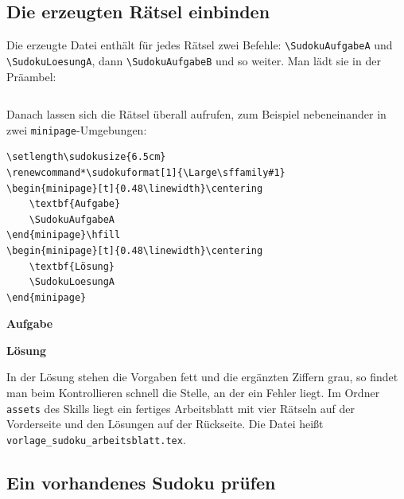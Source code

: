 \subsection{Die erzeugten Rätsel einbinden}

Die erzeugte Datei enthält für jedes Rätsel zwei Befehle: \texttt{\textbackslash SudokuAufgabeA} und \texttt{\textbackslash SudokuLoesungA}, dann \texttt{\textbackslash SudokuAufgabeB} und so weiter. Man lädt sie in der Präambel:

\begin{lstlisting}[style=latex]

\end{lstlisting}

 Danach lassen sich die Rätsel überall aufrufen, zum Beispiel nebeneinander in zwei \texttt{minipage}-Umgebungen:

\begin{lstlisting}[style=latex]
\setlength\sudokusize{6.5cm}
\renewcommand*\sudokuformat[1]{\Large\sffamily#1}
\begin{minipage}[t]{0.48\linewidth}\centering
	\textbf{Aufgabe}
	\SudokuAufgabeA
\end{minipage}\hfill
\begin{minipage}[t]{0.48\linewidth}\centering
	\textbf{Lösung}
	\SudokuLoesungA
\end{minipage}
\end{lstlisting}

\begin{ausgabe}
\setlength\sudokusize{6.5cm}
\renewcommand*\sudokuformat[1]{\Large\sffamily#1}
\begin{minipage}[t]{0.48\linewidth}\centering
	\textbf{Aufgabe}
	\SudokuAufgabeA
\end{minipage}\hfill
\begin{minipage}[t]{0.48\linewidth}\centering
	\textbf{Lösung}
	\SudokuLoesungA
\end{minipage}
\end{ausgabe}

In der Lösung stehen die Vorgaben fett und die ergänzten Ziffern grau, so findet man beim Kontrollieren schnell die Stelle, an der ein Fehler liegt. Im Ordner \texttt{assets} des Skills liegt ein fertiges Arbeitsblatt mit vier Rätseln auf der Vorderseite und den Lösungen auf der Rückseite. Die Datei heißt \texttt{vorlage\_sudoku\_arbeitsblatt.tex}.


\subsection{Ein vorhandenes Sudoku prüfen}

